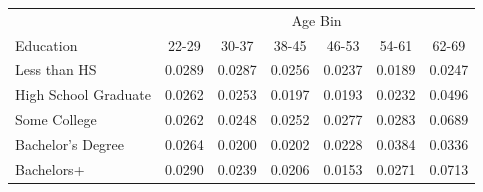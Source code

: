 \begin{tabular}{lcccccc}
\hline\hline
 & \multicolumn{6}{c}{Age Bin} \\
Education & 22-29 & 30-37 & 38-45 & 46-53 & 54-61 & 62-69 \\
\hline
Less than HS&0.0289&0.0287&0.0256&0.0237&0.0189&0.0247\\
High School Graduate&0.0262&0.0253&0.0197&0.0193&0.0232&0.0496\\
Some College&0.0262&0.0248&0.0252&0.0277&0.0283&0.0689\\
Bachelor's Degree&0.0264&0.0200&0.0202&0.0228&0.0384&0.0336\\
Bachelors+&0.0290&0.0239&0.0206&0.0153&0.0271&0.0713\\
\hline\hline
\end{tabular}
